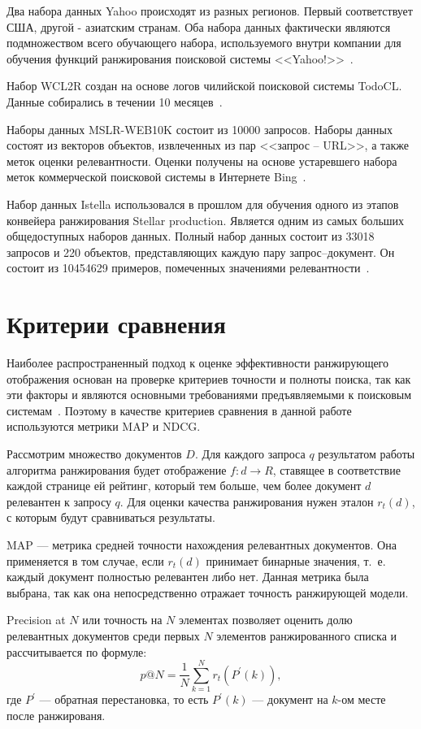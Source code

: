 Два набора данных Yahoo происходят из разных регионов. Первый соответствует США, другой  - азиатским странам. Оба набора данных фактически являются подмножеством всего обучающего набора, используемого внутри компании для обучения функций ранжирования поисковой системы <<Yahoo!>>~\cite{Yahoo}.

Набор WCL2R создан на основе логов чилийской поисковой системы TodoCL. Данные собирались в течении 10 месяцев~\cite{WCL2R}.

Наборы данных MSLR-WEB10K состоит из 10000 запросов. Наборы данных состоят из векторов объектов, извлеченных из пар <<запрос -- URL>>, а также меток оценки релевантности. Оценки получены на основе устаревшего набора меток коммерческой поисковой системы в Интернете Bing~\cite{MSLR}.

Набор данных Istella использовался в прошлом для обучения одного из этапов конвейера ранжирования Stellar production. Является одним из самых больших общедоступных наборов данных. Полный набор данных состоит из 33018 запросов и 220 объектов, представляющих каждую пару запрос--документ. Он состоит из 10454629 примеров, помеченных значениями релевантности~\cite{istella}.

\section{Критерии сравнения}

Наиболее распространенный подход к оценке эффективности ранжирующего отображения основан на проверке критериев точности и полноты поиска, так как эти факторы и являются основными требованиями предъявляемыми к поисковым системам~\cite{metrics}. Поэтому в качестве критериев сравнения в данной работе используются метрики MAP и NDCG.

Рассмотрим множество документов $D$. Для каждого запроса $q$ результатом работы алгоритма ранжирования будет отображение $f: d \to R$, ставящее в соответствие каждой странице ей рейтинг, который тем больше, чем более документ $d$ релевантен к запросу $q$. Для оценки качества ранжирования нужен эталон $r_t(d)$, с которым будут сравниваться результаты.
 
MAP --- метрика средней точности нахождения релевантных документов. Она применяется в том случае, если $r_t(d)$ принимает бинарные значения, т.~е. каждый документ полностью  релевантен либо нет. Данная метрика была выбрана, так как она непосредственно отражает точность ранжирующей модели.

Precision at $N$ или точность на $N$ элементах позволяет оценить долю релевантных документов среди первых $N$ элементов ранжированного списка и рассчитывается по формуле:
\begin{equation}
	\label{eq:map1}
	p @ N=\frac{1}{N} \sum_{k=1}^N r_t(P^{\prime}(k)),
\end{equation}
где $P^{\prime}$ --- обратная перестановка, то есть $P^{\prime}(k)$ --- документ на $k$-ом месте после ранжированя.

